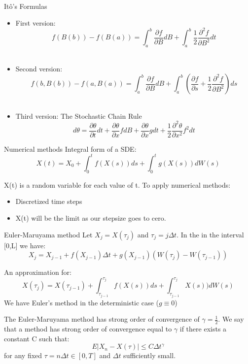 \documentclass[10pt,a4paper]{beamer}
\author{Claudia Lucía Guerrero González}
\begin{document}
\begin{frame}{It\^{o}'s Formulas}
  \begin{itemize}
   \item First version: $$f(B(b))-f(B(a))=\int_{a}^{b}{\frac{\partial f}{\partial B} dB}+\int_{a}^{b}{\frac{1}{2} \frac{\partial^2 f}{\partial B^2} dt} $$\\
    \item Second version: $$f(b,B(b))-f(a,B(a))=\int_{a}^{b}{\frac{\partial f}{\partial B} dB}+\int_{a}^{b}{(\frac{\partial f}{\partial s}+\frac{1}{2}\frac{\partial ^2 f}{\partial B^2}) ds}$$\\
  \item  Third version: The Stochastic Chain Rule $$d\theta=\frac{\partial\theta}{\partial t}dt+\frac{\partial\theta}{\partial x}f dB+\frac{\partial\theta}{\partial x}g dt+\frac{1}{2}\frac{\partial^2\theta}{\partial x^2}f^2dt$$
  \end{itemize}
\end{frame}

\begin{frame}{Numerical methods}
Integral form of a SDE: 
$$X(t)=X_0+\int_{0}^{t}f(X(s))ds+\int_{0}^{t}g(X(s))dW(s)$$

X(t) is a random variable for each value of t. To apply numerical methods:
\begin{itemize}
\item Discretized time steps
\item X(t) will be the limit as our stepsize goes to cero.
\end{itemize}
\end{frame}

\begin{frame}{Euler-Maruyama method}
Let $X_j=X(\tau_j)$ and $\tau_j=j\Delta t$. In the in the interval [0,L] we have:\\
$$X_j=X_{j-1}+f(X_{j-1})\Delta t+g(X_{j-1})(W(\tau_j)-W(\tau_{j-1}))$$

An approximation for:
$$X(\tau_j)=X(\tau_{j-1})+\int_{\tau_{j-1}}^{\tau_{j}}f(X(s))ds+\int_
{\tau_{j-1}}^{\tau_{j}}X(s))dW(s)$$
We have Euler's method in the deterministic case ($g\equiv 0$)

\end{frame}

\begin{frame}
The Euler-Maruyama method has strong order of convergence of \bigskip $\gamma=\frac{1}{2}$.
We say that a method has strong order of convergence equal to $\gamma$ if there exists a constant C such that:
$$E|X_n-X(\tau)|\leq C \Delta t^\gamma$$
for any fixed $\tau=n \Delta t \in [0,T]$ and $\Delta t$ sufficiently small.
\end{frame}
\end{document}
